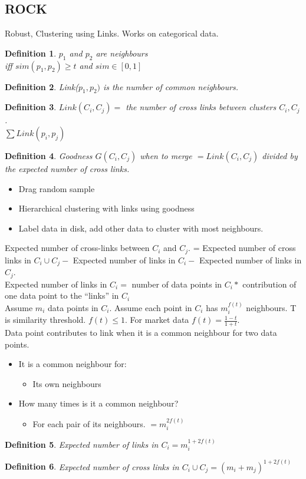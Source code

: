 \documentclass[a4paper]{article}
\newtheorem{definition}{Definition}
\begin{document}
\subsection{ROCK}
Robust, Clustering using Links. Works on categorical data.\\
\begin{definition}
	$p_1$ and $p_2$ are neighbours\\
	iff $sim(p_1,p_2)\geq t $ and $sim\in[0,1]$
\end{definition}
\begin{definition}
	Link($p_1,p_2)$ is the number of common neighbours.
\end{definition}
\begin{definition}
	$Link(C_i,C_j)=$ the number of cross links between clusters $C_i,
	C_j$.\\
	$\sum Link(p_i,p_j)$
\end{definition}
\begin{definition}
	Goodness $G(C_i,C_j)$ when to merge $= Link(C_i,C_j)$ divided by the
	expected number of cross links.
\end{definition}
\begin{itemize}
\item	Drag random sample
\item Hierarchical clustering with links using goodness
\item Label data in disk, add other data to cluster with most neighbours.
\end{itemize}
Expected number of cross-links between $C_i$ and $C_j$.	= Expected number of cross
links in $C_i\cup C_j - $ Expected number of links in $C_i -$ Expected number of
links in
$C_j$.\\
Expected number of links in $C_i =$ number of data points in $C_i *$
contribution of one data point to the ``links'' in $C_i$\\
Assume $m_i$ data points in $C_i$. Assume each point in $C_i$ has $m_i^{f(t)}$
neighbours. T is similarity threshold. $f(t)\leq 1$. For market data
$f(t)=\frac{1-t}{1+t}$.\\
Data point contributes to link when it is a common neighbour for two data
points.
\begin{itemize}
	\item It is a common neighbour for:
		\begin{itemize}
			\item Its own neighbours
		\end{itemize}
	\item How many times is it a common neighbour?
		\begin{itemize}
			\item For each pair of its neighbours. $=m_i^{2f(t)}$
		\end{itemize}
\end{itemize}
\begin{definition}
	Expected number of links in $C_i = m_i^{1+2f(t)}$
\end{definition}
\begin{definition}
	Expected number of cross links in $C_i\cup C_j = (m_i+m_j)^{1+2f(t)}$
\end{definition}
\end{document}
